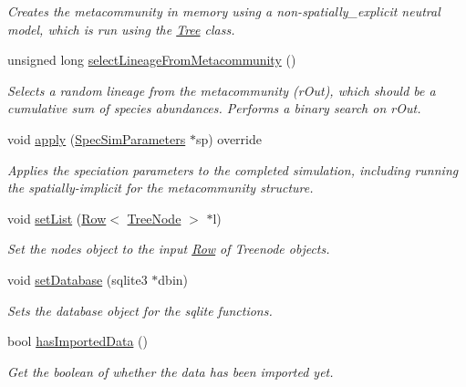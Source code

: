 \begin{DoxyCompactItemize}
\begin{DoxyCompactList}\small\item\em Creates the metacommunity in memory using a non-\/spatially\+\_\+explicit neutral model, which is run using the \hyperlink{class_tree}{Tree} class. \end{DoxyCompactList}\item 
unsigned long \hyperlink{class_metacommunity_ac1884bfd79b272d8dcb470f34f579cf1}{select\+Lineage\+From\+Metacommunity} ()
\begin{DoxyCompactList}\small\item\em Selects a random lineage from the metacommunity (r\+Out), which should be a cumulative sum of species abundances. Performs a binary search on r\+Out. \end{DoxyCompactList}\item 
void \hyperlink{class_metacommunity_adf30667aa617bc969706eab2facd5482}{apply} (\hyperlink{struct_spec_sim_parameters}{Spec\+Sim\+Parameters} $\ast$sp) override
\begin{DoxyCompactList}\small\item\em Applies the speciation parameters to the completed simulation, including running the spatially-\/implicit for the metacommunity structure. \end{DoxyCompactList}\item 
void \hyperlink{class_community_a710a402dffa1b85183dd7f4a5a44f988}{set\+List} (\hyperlink{class_row}{Row}$<$ \hyperlink{class_tree_node}{Tree\+Node} $>$ $\ast$l)
\begin{DoxyCompactList}\small\item\em Set the nodes object to the input \hyperlink{class_row}{Row} of Treenode objects. \end{DoxyCompactList}\item 
void \hyperlink{class_community_a6fe2fdb93911f403dd879ca2847e4933}{set\+Database} (sqlite3 $\ast$dbin)
\begin{DoxyCompactList}\small\item\em Sets the database object for the sqlite functions. \end{DoxyCompactList}\item 
bool \hyperlink{class_community_a045f762ca30c3a20e8ef5911a4982160}{has\+Imported\+Data} ()
\begin{DoxyCompactList}\small\item\em Get the boolean of whether the data has been imported yet. \end{DoxyCompactList}\item 

\end{DoxyCompactItemize}
